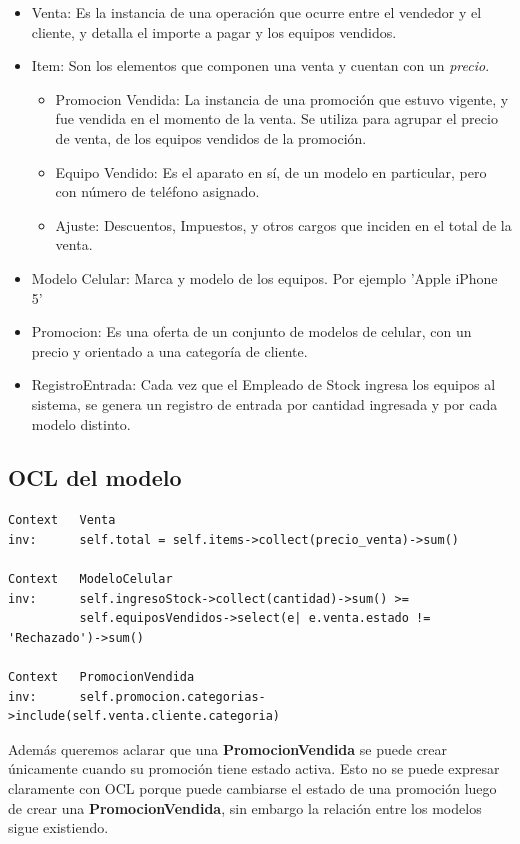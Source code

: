 \begin{itemize}
  \item Venta: Es la instancia de una operación que ocurre entre el vendedor y el cliente, y detalla el importe a pagar y los equipos vendidos.

  \item Item: Son los elementos que componen una venta y cuentan con un \textit{precio}.
    \begin{itemize}
      \item Promocion Vendida: La instancia de una promoción que estuvo vigente, y fue vendida en el momento de la venta. Se utiliza para agrupar el precio de venta, de los equipos vendidos de la promoción.
      \item Equipo Vendido: Es el aparato en sí, de un modelo en particular, pero con número de teléfono asignado.
      \item Ajuste: Descuentos, Impuestos, y otros cargos que inciden en el total de la venta.
    \end{itemize}
  \item Modelo Celular: Marca y modelo de los equipos. Por ejemplo 'Apple iPhone 5'

  \item Promocion: Es una oferta de un conjunto de modelos de celular, con un precio y orientado a una categoría de cliente.

  \item RegistroEntrada: Cada vez que el Empleado de Stock ingresa los equipos al sistema, se genera un registro de entrada por cantidad ingresada y por cada modelo distinto.
\end{itemize}

\subsection{OCL del modelo}

\begin{verbatim}
Context   Venta
inv:      self.total = self.items->collect(precio_venta)->sum()

Context   ModeloCelular
inv:      self.ingresoStock->collect(cantidad)->sum() >= 
          self.equiposVendidos->select(e| e.venta.estado != 'Rechazado')->sum()

Context   PromocionVendida
inv:      self.promocion.categorias->include(self.venta.cliente.categoria)
\end{verbatim}

Además queremos aclarar que una \textbf{PromocionVendida} se puede crear únicamente cuando su promoción tiene estado activa. Esto no se puede expresar claramente con OCL porque puede cambiarse el estado de una promoción luego de crear una \textbf{PromocionVendida}, sin embargo la relación entre los modelos sigue existiendo.

